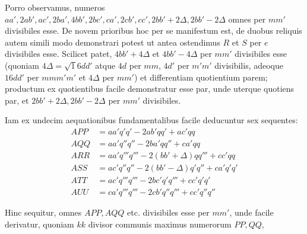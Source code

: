 Porro observamus, numeros $aa',2ab',ac',2ba',4bb',2bc',ca',2cb',cc',2bb'+2\Delta,2bb'-2\Delta$ omnes per $mm'$ divisibiles esse. De novem prioribus hoc per se manifestum est, de duobus reliquis autem simili modo demonstrari potest ut antea ostendimus $R$ et $S$ per $e$ divisibiles esse. Scilicet patet, $4bb'+4\Delta$ et $4bb'-4\Delta$ per $mm'$ divisibiles esse (quoniam $4\Delta=\surd16dd'$ atque $4d$ per $mm$, $4d'$ per $m'm'$ divisibilis, adeoque $16dd'$ per $mmm'm'$ et $4\Delta$ per $mm'$) et differentiam quotientium parem; productum ex quotientibus facile demonstratur esse par, unde uterque quotiens par, et $2bb'+2\Delta,2bb'-2\Delta$ per $mm'$ divisibiles.

Iam ex undecim aequationibus fundamentalibus facile deducuntur sex sequentes:
\[
\begin{aligned}
APP&=aa'q'q'-2ab'qq'+ac'qq\\
AQQ&=aa'q''q''-2ba'qq''+ca'qq\\
ARR&=aa'q'''q'''-2(bb'+\Delta)qq'''+cc'qq\\
ASS&=ac'q''q''-2(bb'-\Delta)q'q''+ca'q'q'\\
ATT&=ac'q'''q'''-2bc'q'q'''+cc'q'q'\\
AUU&=ca'q'''q'''-2cb'q''q'''+cc'q''q''
\end{aligned}
\]

Hinc sequitur, omnes $APP,AQQ$ etc. divisibiles esse per $mm'$, unde facile derivatur, quoniam $kk$ divisor communis maximus numerorum $PP,QQ,$

